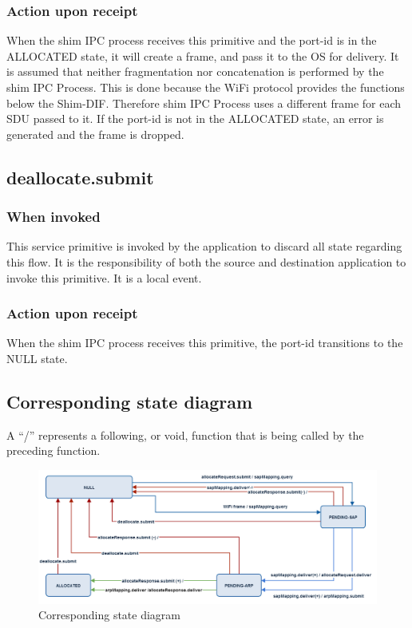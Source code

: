 \subsubsection{Action upon receipt}
When the shim IPC process receives this primitive and the port-id is in the ALLOCATED state, it will create a frame, and pass it to the OS for delivery. It is assumed that neither fragmentation nor concatenation is performed by the shim IPC Process. This is done because the WiFi protocol provides the functions below the Shim-DIF. Therefore shim IPC Process uses a different frame for each SDU passed to it. If the port-id is not in the ALLOCATED state, an error is generated and the frame is dropped. 


\subsection{deallocate.submit}
\subsubsection{When invoked}
This service primitive is invoked by the application to discard all state regarding this flow. It is the responsibility of both the source and destination application to invoke this primitive. It is a local event.
\subsubsection{Action upon receipt}
When the shim IPC process receives this primitive, the port-id transitions to the NULL state.


\subsection{Corresponding state diagram}

A ``/'' represents a following, or void, function that is being called by the preceding function. 

\begin{figure}[H]
    \centering
    \includegraphics[height=0.6\textwidth, angle=270]{figures/state_diagram2}
    \caption{Corresponding state diagram} 
    \label{fig:state_diagram}
\end{figure}

